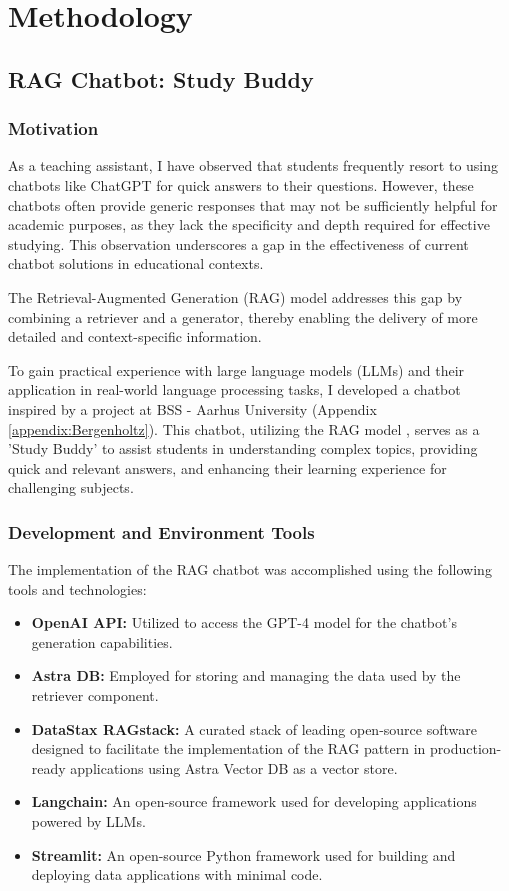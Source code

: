 \chapter{Methodology}

\section{RAG Chatbot: Study Buddy}

    \subsection{Motivation}
    As a teaching assistant, I have observed that students frequently resort to using chatbots like ChatGPT for quick answers to their questions. However, these chatbots often provide generic responses that may not be sufficiently helpful for academic purposes, as they lack the specificity and depth required for effective studying. This observation underscores a gap in the effectiveness of current chatbot solutions in educational contexts.

    The Retrieval-Augmented Generation (RAG) model addresses this gap by combining a retriever and a generator, thereby enabling the delivery of more detailed and context-specific information. 
    
    To gain practical experience with large language models (LLMs) and their application in real-world language processing tasks, I developed a chatbot inspired by a project at BSS - Aarhus University (Appendix \ref{appendix:Bergenholtz}). This chatbot, utilizing the RAG model \cite{lewis2020RAG}, serves as a 'Study Buddy' to assist students in understanding complex topics, providing quick and relevant answers, and enhancing their learning experience for challenging subjects.

    \subsection{Development and Environment Tools}
    The implementation of the RAG chatbot was accomplished using the following tools and technologies:
    \begin{itemize}
        \item \textbf{OpenAI API:} Utilized to access the GPT-4 model for the chatbot's generation capabilities.
        \item \textbf{Astra DB:} Employed for storing and managing the data used by the retriever component.
        \item \textbf{DataStax RAGstack:} A curated stack of leading open-source software designed to facilitate the implementation of the RAG pattern in production-ready applications using Astra Vector DB as a vector store.
        \item \textbf{Langchain:} An open-source framework used for developing applications powered by LLMs.
        \item \textbf{Streamlit:} An open-source Python framework used for building and deploying data applications with minimal code.
    \end{itemize}


